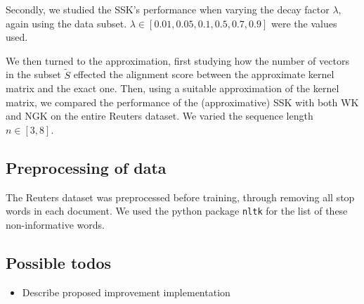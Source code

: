 Secondly, we studied the SSK's performance when varying the decay factor $ \lambda $, again using the data subset. $ \lambda \in [0.01, 0.05, 0.1, 0.5, 0.7, 0.9] $ were the values used. 

We then turned to the approximation, first studying how the number of vectors in the subset $ \tilde{S} $ effected the alignment score between the approximate kernel matrix and the exact one. Then, using a suitable approximation of the kernel matrix, we compared the performance of the (approximative) SSK with both WK and NGK on the entire Reuters dataset. We varied the sequence length $ n\in [3,8] $.  

\subsection{Preprocessing of data}
The Reuters dataset was preprocessed before training, through removing all stop words in each document. We used the python package \texttt{nltk} for the list of these non-informative words.




\subsection{Possible todos}
\begin{itemize}
	\item Describe proposed improvement implementation 
\end{itemize}

